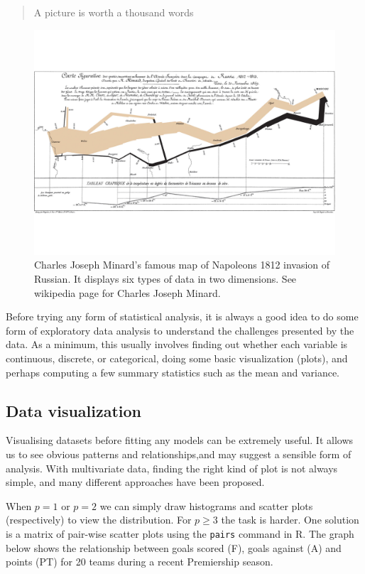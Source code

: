 \documentclass[
]{book}
\theoremstyle{definition}
\theoremstyle{definition}
\theoremstyle{definition}
\theoremstyle{definition}
\theoremstyle{remark}
\begin{document}
\begin{quote}
A picture is worth a thousand words
\end{quote}

\begin{figure}
\includegraphics[width=1\linewidth]{figs/Minard} \caption{Charles Joseph Minard's famous map of Napoleons 1812 invasion of Russian. It displays six types of data in two dimensions. See wikipedia page for Charles Joseph Minard.}\label{fig:unnamed-chunk-5}
\end{figure}

Before trying any form of statistical analysis, it is always a good idea to do some form of exploratory data analysis to understand the challenges presented by the data. As a minimum, this usually involves finding out whether each variable is continuous, discrete, or categorical, doing some basic visualization (plots), and perhaps computing a few summary statistics such as the mean and variance.

\hypertarget{data-visualization}{%
\subsection{Data visualization}\label{data-visualization}}

Visualising datasets before fitting any models can be extremely useful. It allows us to see obvious patterns and relationships,and may suggest a sensible form of analysis.
With multivariate data, finding the right kind of plot is not always simple, and many different approaches have been proposed.

When \(p=1\) or \(p=2\) we can simply draw histograms and scatter plots (respectively) to view the distribution. For \(p \geq 3\) the task is harder. One solution is a matrix of pair-wise scatter plots using the \texttt{pairs} command in R. The graph below shows the relationship between goals scored (F), goals against (A) and points (PT) for 20 teams during a recent Premiership season.
\end{document}
